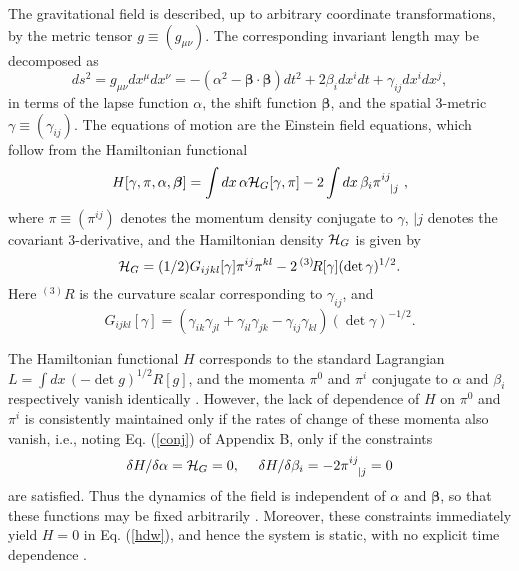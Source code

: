 \documentclass[a4paper,preprint, showpacs, aps, draft]{revtex4}
\begin{document}
{The gravitational field is described, up to arbitrary coordinate
transformations, by the metric tensor $g\equiv(g_{\mu\nu})$.  The corresponding
invariant length may be decomposed as \cite{dw}
\[
ds^2 = g_{\mu\nu}dx^\mu dx^\nu  = - (\alpha^2-{\bm \beta}\cdot {\bm \beta})dt^2
+ 2\beta_idx^idt+\gamma_{ij}dx^idx^j , \]
in terms of the lapse function $\alpha$, the shift function ${\bm
\beta}$, and the spatial 3-metric $\gamma\equiv(\gamma_{ij})$.  The
equations of motion are the Einstein field equations, which follow from
the Hamiltonian functional \cite{dw}
\begin{equation} \label{hdw}
H[\gamma, \pi,\alpha,{\bm \beta}] = \int dx\, \alpha{\cal H}_G[\gamma, \pi] -
2\int dx\,\beta_i\pi^{ij}_{~~|j}~ ,
\end{equation}
where $\pi\equiv(\pi^{ij})$ denotes the momentum density conjugate to
$\gamma$, $|j$ denotes the covariant 3-derivative, and the Hamiltonian
density ${\cal H}_G$ is given by
\begin{equation} \label{hg}
{\cal H}_G = 
(1/2) G_{ijkl}[\gamma]\pi^{ij}\pi^{kl} - 2\,
{}^{(3)}\!R[\gamma](\det\gamma)^{1/2} .
\end{equation}
Here ${}^{(3)}\!R$ is the curvature scalar corresponding to
$\gamma_{ij}$, and
\[
G_{ijkl}[\gamma] =(\gamma_{ik}\gamma_{jl}+\gamma_{il}\gamma_{jk}
-\gamma_{ij}\gamma_{kl})(\det \gamma)^{-1/2} . \]

The Hamiltonian functional $H$ corresponds to the standard Lagrangian 
$L=\int dx\,(-\det
g)^{1/2} R[g]$, 
and the momenta $\pi^0$ and $\pi^i$ conjugate to $\alpha$ and $\beta_i$
respectively vanish identically \cite{dw}.  However, the lack of dependence of
$H$ on $\pi^0$ and $\pi^i$ is consistently maintained only if the rates
of change of these momenta also vanish, i.e., noting Eq. (\ref{conj}) of
Appendix B, only if the constraints \cite{dw}
\begin{equation} \label{constraint}
\delta H/\delta\alpha = {\cal H}_G = 0,~~~~\delta H/\delta\beta_i = -2
\pi^{ij}_{~~| j}=0
\end{equation}
are satisfied.  Thus the dynamics of the field
is independent of $\alpha$ and ${\bm \beta}$, so that these 
functions may be fixed arbitrarily \cite{dw}.  Moreover, these
constraints 
immediately yield $H=0$ in Eq. (\ref{hdw}), and hence 
the system is static, with no explicit time dependence \cite{dw}.

}
\end{document}
